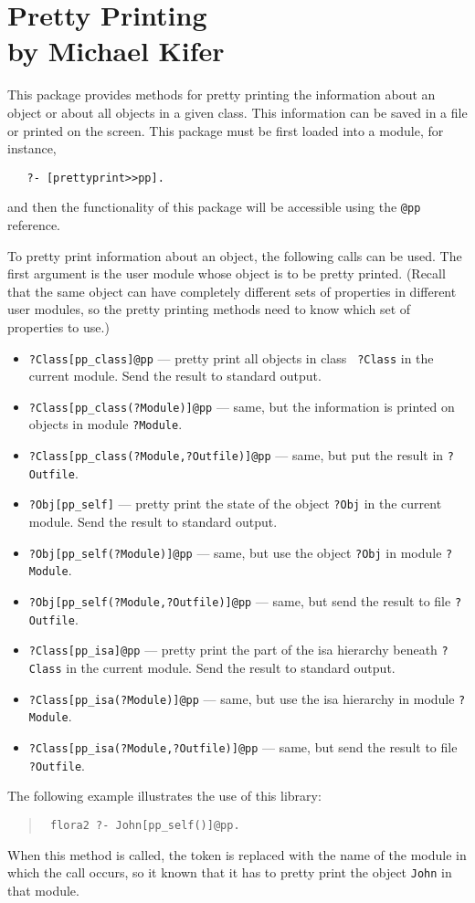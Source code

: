 \chapter[Pretty Printing]{Pretty Printing\\{by Michael Kifer}}


This package provides methods for pretty printing the information about an
object or about all objects in a given class. This information can be saved
in a file or printed on the screen. This package must be first loaded into
a module, for instance, 
\begin{verbatim}
   ?- [prettyprint>>pp].
\end{verbatim}
and then the functionality of this package will be
accessible using the {\tt @pp} reference.

To pretty print information about an object, the following calls can be
used.  The first argument is the user module whose object is to be pretty
printed. (Recall that the same object can have completely different sets of
properties in different user modules, so the pretty printing methods need to
know which set of properties to use.)
\begin{itemize}
\item {\tt ?Class[pp\_class]@pp} --- pretty print all objects in class {\tt
  ?Class} in the current module. Send the result to standard output.
\item {\tt ?Class[pp\_class(?Module)]@pp} --- same, but the information is
  printed on objects in module {\tt ?Module}. 
\item  {\tt ?Class[pp\_class(?Module,?Outfile)]@pp} --- same, but
  put the result in {\tt ?Outfile}.
\item {\tt ?Obj[pp\_self]} --- pretty print the state of the object {\tt ?Obj}
  in the current module. Send the result to standard output.
\item {\tt ?Obj[pp\_self(?Module)]@pp} --- same, but use the object {\tt ?Obj}
  in module {\tt ?Module}.  
\item {\tt ?Obj[pp\_self(?Module,?Outfile)]@pp} --- same, but send the result 
  to file {\tt ?Outfile}. 
\item {\tt ?Class[pp\_isa]@pp} --- pretty print the part of the isa
  hierarchy beneath {\tt ?Class} in the current module. Send the result to
  standard output.
\item {\tt ?Class[pp\_isa(?Module)]@pp} --- same, but use the isa hierarchy in
  module {\tt ?Module}. 
\item {\tt ?Class[pp\_isa(?Module,?Outfile)]@pp} --- same, but send the result
  to file {\tt ?Outfile}.
\end{itemize}
The following example illustrates the use of this library:
\begin{quote}
 {\tt
  flora2 ?- John[pp\_self(\thismodule)]@pp.
   }
\end{quote}
When this method is called, the token \thismodule is replaced with the name
of the module in which the call occurs, so it known that it has to pretty
print the object {\tt John} in that module.



